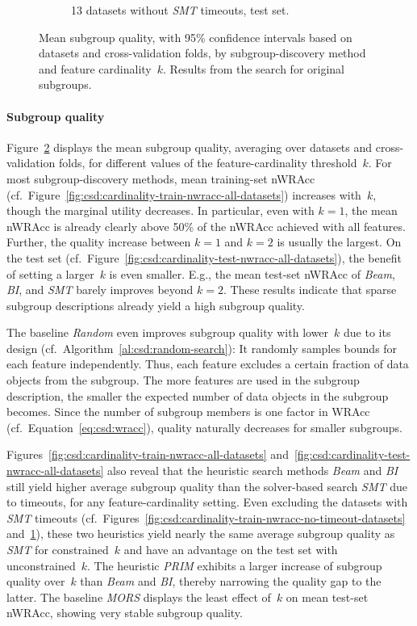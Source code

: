 \documentclass{article}
\theoremstyle{definition}
\begin{document}
\begin{figure}[t]
\begin{subfigure}[t]{0.48\textwidth}
		\caption{13 datasets without \emph{SMT} timeouts, test set.}
		\label{fig:csd:cardinality-test-nwracc-no-timeout-datasets}
	\end{subfigure}
	\caption{
		Mean subgroup quality, with 95\% confidence intervals based on datasets and cross-validation folds, by subgroup-discovery method and feature cardinality~$k$.
		Results from the search for original subgroups.
	}
	\label{fig:csd:cardinality-nwracc}
\end{figure}

\paragraph{Subgroup quality}

Figure~\ref{fig:csd:cardinality-nwracc} displays the mean subgroup quality, averaging over datasets and cross-validation folds, for different values of the feature-cardinality threshold~$k$.
For most subgroup-discovery methods, mean training-set nWRAcc (cf.~Figure~\ref{fig:csd:cardinality-train-nwracc-all-datasets}) increases with~$k$, though the marginal utility decreases.
In particular, even with $k=1$, the mean nWRAcc is already clearly above 50\% of the nWRAcc achieved with all features.
Further, the quality increase between $k=1$ and $k=2$ is usually the largest.
On the test set (cf.~Figure~\ref{fig:csd:cardinality-test-nwracc-all-datasets}), the benefit of setting a larger~$k$ is even smaller.
E.g., the mean test-set nWRAcc of \emph{Beam}, \emph{BI}, and \emph{SMT} barely improves beyond $k=2$.
These results indicate that sparse subgroup descriptions already yield a high subgroup quality.

The baseline \emph{Random} even improves subgroup quality with lower~$k$ due to its design (cf.~Algorithm~\ref{al:csd:random-search}):
It randomly samples bounds for each feature independently.
Thus, each feature excludes a certain fraction of data objects from the subgroup.
The more features are used in the subgroup description, the smaller the expected number of data objects in the subgroup becomes.
Since the number of subgroup members is one factor in WRAcc (cf.~Equation~\ref{eq:csd:wracc}), quality naturally decreases for smaller subgroups.

Figures~\ref{fig:csd:cardinality-train-nwracc-all-datasets} and~\ref{fig:csd:cardinality-test-nwracc-all-datasets} also reveal that the heuristic search methods \emph{Beam} and \emph{BI} still yield higher average subgroup quality than the solver-based search \emph{SMT} due to timeouts, for any feature-cardinality setting.
Even excluding the datasets with \emph{SMT} timeouts (cf.~Figures~\ref{fig:csd:cardinality-train-nwracc-no-timeout-datasets} and~\ref{fig:csd:cardinality-test-nwracc-no-timeout-datasets}), these two heuristics yield nearly the same average subgroup quality as \emph{SMT} for constrained~$k$ and have an advantage on the test set with unconstrained~$k$.
The heuristic \emph{PRIM} exhibits a larger increase of subgroup quality over~$k$ than \emph{Beam} and \emph{BI}, thereby narrowing the quality gap to the latter.
The baseline \emph{MORS} displays the least effect of~$k$ on mean test-set nWRAcc, showing very stable subgroup quality.
\end{document}
